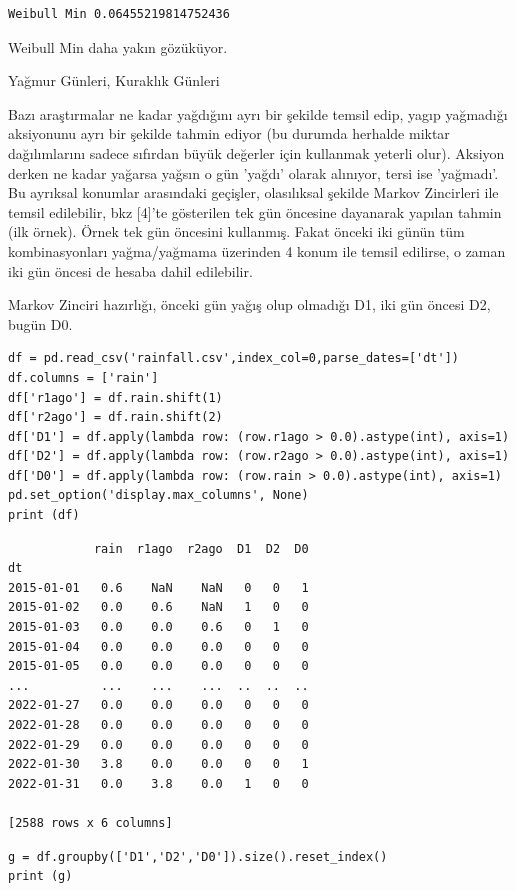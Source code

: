 \documentclass[12pt,fleqn]{article}\usepackage{../../common}
\begin{document}
\begin{verbatim}
Weibull Min 0.06455219814752436
\end{verbatim}

Weibull Min daha yakın gözüküyor.

Yağmur Günleri, Kuraklık Günleri

Bazı araştırmalar ne kadar yağdığını ayrı bir şekilde temsil edip, yagıp
yağmadığı aksiyonunu ayrı bir şekilde tahmin ediyor (bu durumda herhalde miktar
dağılımlarını sadece sıfırdan büyük değerler için kullanmak yeterli
olur). Aksiyon derken ne kadar yağarsa yağsın o gün 'yağdı' olarak alınıyor,
tersi ise 'yağmadı'. Bu ayrıksal konumlar arasındaki geçişler, olasılıksal
şekilde Markov Zincirleri ile temsil edilebilir, bkz [4]'te gösterilen tek gün
öncesine dayanarak yapılan tahmin (ilk örnek). Örnek tek gün öncesini
kullanmış. Fakat önceki iki günün tüm kombinasyonları yağma/yağmama üzerinden 4
konum ile temsil edilirse, o zaman iki gün öncesi de hesaba dahil edilebilir.

Markov Zinciri hazırlığı, önceki gün yağış olup olmadığı D1, iki gün öncesi D2,
bugün D0.

\begin{verbatim}
df = pd.read_csv('rainfall.csv',index_col=0,parse_dates=['dt'])
df.columns = ['rain']
df['r1ago'] = df.rain.shift(1)
df['r2ago'] = df.rain.shift(2)
df['D1'] = df.apply(lambda row: (row.r1ago > 0.0).astype(int), axis=1)
df['D2'] = df.apply(lambda row: (row.r2ago > 0.0).astype(int), axis=1)
df['D0'] = df.apply(lambda row: (row.rain > 0.0).astype(int), axis=1)
pd.set_option('display.max_columns', None)
print (df)
\end{verbatim}

\begin{verbatim}
            rain  r1ago  r2ago  D1  D2  D0
dt                                        
2015-01-01   0.6    NaN    NaN   0   0   1
2015-01-02   0.0    0.6    NaN   1   0   0
2015-01-03   0.0    0.0    0.6   0   1   0
2015-01-04   0.0    0.0    0.0   0   0   0
2015-01-05   0.0    0.0    0.0   0   0   0
...          ...    ...    ...  ..  ..  ..
2022-01-27   0.0    0.0    0.0   0   0   0
2022-01-28   0.0    0.0    0.0   0   0   0
2022-01-29   0.0    0.0    0.0   0   0   0
2022-01-30   3.8    0.0    0.0   0   0   1
2022-01-31   0.0    3.8    0.0   1   0   0

[2588 rows x 6 columns]
\end{verbatim}

\begin{verbatim}
g = df.groupby(['D1','D2','D0']).size().reset_index()
print (g)
\end{verbatim}
\end{document}
